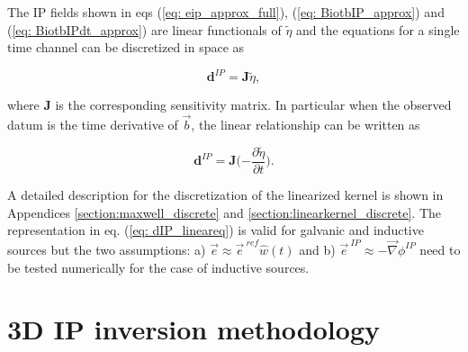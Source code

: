 \documentclass[extra,mreferee]{gji}
\newcommand{\grad}{\vec \nabla}
\renewcommand {\b}  { {\vec b} }
\newcommand {\e}  { {\vec e} }
\newcommand{\peta}{\tilde{\eta}}
\newcommand{\eref}{\e^{\ ref}}
\begin{document}
The IP fields shown in eqs (\ref{eq: eip_approx_full}), (\ref{eq: BiotbIP_approx}) and (\ref{eq: BiotbIPdt_approx}) are linear functionals of $\peta$ and the equations for a single time channel can be discretized in space as
\begin{linenomath*}
\begin{equation}
  \mathbf{d}^{IP} = \mathbf{J}\peta,
  \label{eq: dIP_lineareq}
\end{equation}
\end{linenomath*}
where $\mathbf{J}$ is the corresponding sensitivity matrix.
In particular when the observed datum is the time derivative of $\b$, the linear relationship can be written as
\begin{linenomath*}
\begin{equation}
  \mathbf{d}^{IP} = \mathbf{J}(-\frac{\partial \peta}{\partial t}\Big).
  \label{eq: dIP_lineareq_dbdt}
\end{equation}
\end{linenomath*}
A detailed description for the discretization of the linearized kernel is shown in Appendices \ref{section:maxwell_discrete} and \ref{section:linearkernel_discrete}.
The representation in eq. (\ref{eq: dIP_lineareq}) is valid for galvanic and inductive sources but the two assumptions: a) $\e \approx \eref \hat{w}(t)$ and b) $\e^{\ IP} \approx -\grad\phi^{IP}$ need to be tested numerically for the case of inductive sources.


\section{3D IP inversion methodology}
\end{document}
